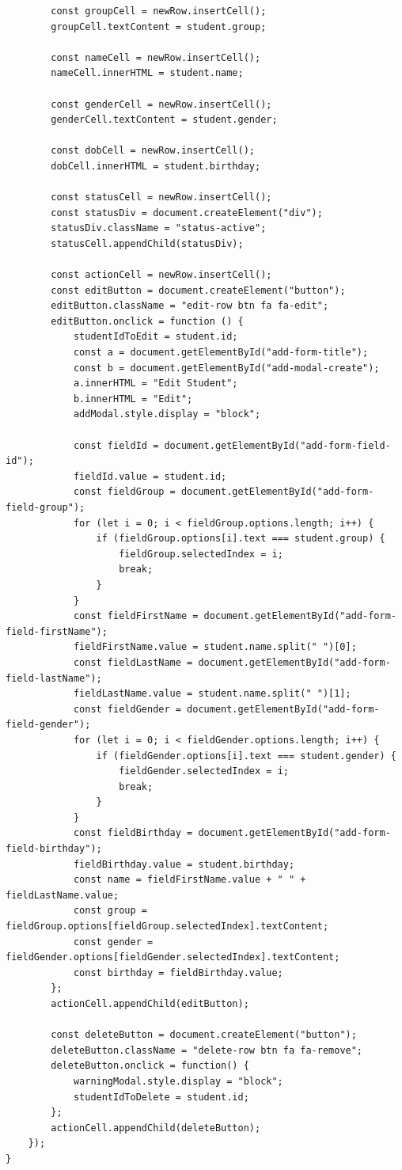 \documentclass{article}
\begin{document}
\begin{normalsize}
\begin{lstlisting}
		const groupCell = newRow.insertCell();
		groupCell.textContent = student.group;
		
		const nameCell = newRow.insertCell();
		nameCell.innerHTML = student.name;
		
		const genderCell = newRow.insertCell();
		genderCell.textContent = student.gender;
		
		const dobCell = newRow.insertCell();
		dobCell.innerHTML = student.birthday;
		
		const statusCell = newRow.insertCell();
		const statusDiv = document.createElement("div");
		statusDiv.className = "status-active";
		statusCell.appendChild(statusDiv);
		
		const actionCell = newRow.insertCell();
		const editButton = document.createElement("button");
		editButton.className = "edit-row btn fa fa-edit";
		editButton.onclick = function () {
			studentIdToEdit = student.id;
			const a = document.getElementById("add-form-title");
			const b = document.getElementById("add-modal-create");
			a.innerHTML = "Edit Student";
			b.innerHTML = "Edit";
			addModal.style.display = "block";
			
			const fieldId = document.getElementById("add-form-field-id");
			fieldId.value = student.id;
			const fieldGroup = document.getElementById("add-form-field-group");
			for (let i = 0; i < fieldGroup.options.length; i++) {
				if (fieldGroup.options[i].text === student.group) {
					fieldGroup.selectedIndex = i;
					break;
				}
			}
			const fieldFirstName = document.getElementById("add-form-field-firstName");
			fieldFirstName.value = student.name.split(" ")[0];
			const fieldLastName = document.getElementById("add-form-field-lastName");
			fieldLastName.value = student.name.split(" ")[1];
			const fieldGender = document.getElementById("add-form-field-gender");
			for (let i = 0; i < fieldGender.options.length; i++) {
				if (fieldGender.options[i].text === student.gender) {
					fieldGender.selectedIndex = i;
					break;
				}
			}
			const fieldBirthday = document.getElementById("add-form-field-birthday");
			fieldBirthday.value = student.birthday;
			const name = fieldFirstName.value + " " + fieldLastName.value;
			const group = fieldGroup.options[fieldGroup.selectedIndex].textContent;
			const gender = fieldGender.options[fieldGender.selectedIndex].textContent;
			const birthday = fieldBirthday.value;
		};
		actionCell.appendChild(editButton);
		
		const deleteButton = document.createElement("button");
		deleteButton.className = "delete-row btn fa fa-remove";
		deleteButton.onclick = function() {
			warningModal.style.display = "block";
			studentIdToDelete = student.id;
		};
		actionCell.appendChild(deleteButton);
	});
}


\end{lstlisting}
\end{normalsize}
\end{document}
